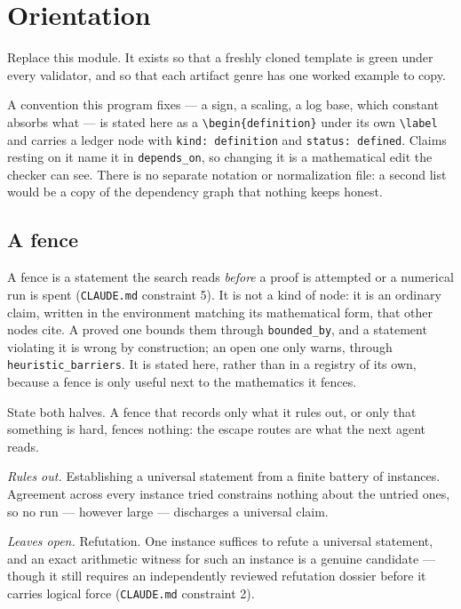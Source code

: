 \documentclass[../../main.tex]{subfiles}
\begin{document}
\section{Orientation}
\label{sec:overview}

Replace this module. It exists so that a freshly cloned template is green under
every validator, and so that each artifact genre has one worked example to copy.

A convention this program fixes --- a sign, a scaling, a log base, which constant
absorbs what --- is stated here as a \texttt{\textbackslash begin\{definition\}}
under its own \texttt{\textbackslash label} and carries a ledger node with
\texttt{kind: definition} and \texttt{status: defined}. Claims resting on it name
it in \texttt{depends\_on}, so changing it is a mathematical edit the checker can
see. There is no separate notation or normalization file: a second list would be a
copy of the dependency graph that nothing keeps honest.

\subsection{A fence}

A fence is a statement the search reads \emph{before} a proof is attempted or a
numerical run is spent (\texttt{CLAUDE.md} constraint 5). It is not a kind of node: it
is an ordinary claim, written in the environment matching its mathematical form, that
other nodes cite. A proved one bounds them through \texttt{bounded\_by}, and a statement
violating it is wrong by construction; an open one only warns, through
\texttt{heuristic\_barriers}. It is stated here, rather than in a registry of its own,
because a fence is only useful next to the mathematics it fences.

State both halves. A fence that records only what it rules out, or only that something
is hard, fences nothing: the escape routes are what the next agent reads.

\begin{conjecture}
\label{conj:finite-battery}
  \emph{Rules out.} Establishing a universal statement from a finite battery of
  instances. Agreement across every instance tried constrains nothing about the
  untried ones, so no run --- however large --- discharges a universal claim.

  \emph{Leaves open.} Refutation. One instance suffices to refute a universal
  statement, and an exact arithmetic witness for such an instance is a genuine
  candidate --- though it still requires an independently reviewed refutation
  dossier before it carries logical force (\texttt{CLAUDE.md} constraint 2).
\end{conjecture}
\end{document}
